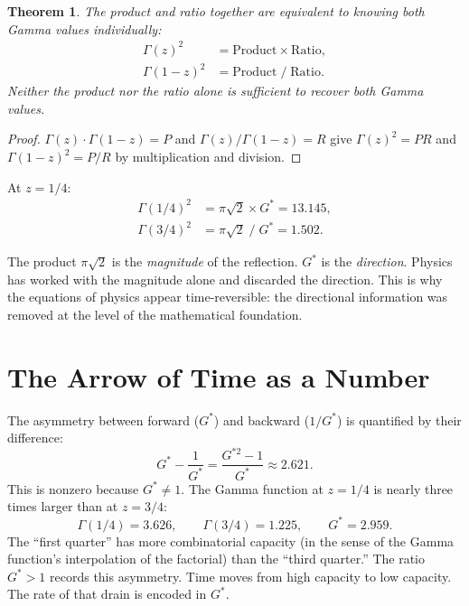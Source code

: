 \documentclass[12pt,letterpaper]{article}
\newtheorem{theorem}{Theorem}
\begin{document}
\begin{theorem}
The product and ratio together are equivalent to knowing both Gamma values individually:
\begin{align}
\Gamma(z)^2 &= \text{Product} \times \text{Ratio}, \\
\Gamma(1-z)^2 &= \text{Product} \;/\; \text{Ratio}.
\end{align}
Neither the product nor the ratio alone is sufficient to recover both Gamma values.
\end{theorem}

\begin{proof}
$\Gamma(z) \cdot \Gamma(1-z) = P$ and $\Gamma(z)/\Gamma(1-z) = R$ give $\Gamma(z)^2 = PR$ and $\Gamma(1-z)^2 = P/R$ by multiplication and division.
\end{proof}

At $z = 1/4$:
\begin{align}
\Gamma(1/4)^2 &= \pi\sqrt{2} \times G^* = 13.145, \\
\Gamma(3/4)^2 &= \pi\sqrt{2} \;/\; G^* = 1.502.
\end{align}

The product $\pi\sqrt{2}$ is the \emph{magnitude} of the reflection. $G^*$ is the \emph{direction}. Physics has worked with the magnitude alone and discarded the direction. This is why the equations of physics appear time-reversible: the directional information was removed at the level of the mathematical foundation.

\section{The Arrow of Time as a Number}

The asymmetry between forward ($G^*$) and backward ($1/G^*$) is quantified by their difference:
\begin{equation}
G^* - \frac{1}{G^*} = \frac{G^{*2} - 1}{G^*} \approx 2.621.
\end{equation}
This is nonzero because $G^* \neq 1$. The Gamma function at $z = 1/4$ is nearly three times larger than at $z = 3/4$:
\begin{equation}
\Gamma(1/4) = 3.626, \qquad \Gamma(3/4) = 1.225, \qquad G^* = 2.959.
\end{equation}
The ``first quarter'' has more combinatorial capacity (in the sense of the Gamma function's interpolation of the factorial) than the ``third quarter.'' The ratio $G^* > 1$ records this asymmetry. Time moves from high capacity to low capacity. The rate of that drain is encoded in $G^*$.
\end{document}
